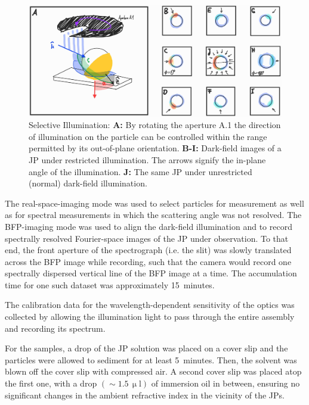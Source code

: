 \documentclass[10pt]{article}
\begin{document}
\begin{multicols}{2}
\begin{figure}[t!]
    \centering
    \includegraphics[width=\textwidth]{[fig] selective illumination}
    \caption{Selective Illumination:   
    {\sffamily\bfseries A:} By rotating the aperture A.1 the direction of illumination on the particle can be controlled within the range permitted by its out-of-plane orientation. 
    {\sffamily\bfseries B-I:} Dark-field images of a JP under restricted illumination. 
    The arrows signify the in-plane angle of the illumination.  
    {\sffamily\bfseries J:} The same JP under unrestricted (normal) dark-field illumination. 
    }
    \label{fig:selective-illumination}
\end{figure}

The real-space-imaging mode was used to select particles for measurement as well as for spectral measurements in which the scattering angle was not resolved. 
The BFP-imaging mode was used to align the dark-field illumination and to record spectrally resolved Fourier-space images of the JP under observation. 
To that end, the front aperture of the spectrograph (i.e. the slit) was slowly translated across the BFP image while recording, such that the camera would record one spectrally dispersed vertical line of the BFP image at a time. 
The accumulation time for one such dataset was approximately \mbox{15 minutes}.  

The calibration data for the wavelength-dependent sensitivity of the optics was collected by allowing the illumination light to pass through the entire assembly and recording its spectrum. 

For the samples, a drop of the JP solution was placed on a cover slip and the particles were allowed to sediment for at least \mbox{5 minutes}. 
Then, the solvent was blown off the cover slip with compressed air. 
A second cover slip was placed atop the first one, with a drop \mbox{$(\sim 1.5\,\mathrm{\upmu l})$} of immersion oil in between, ensuring no significant changes in the ambient refractive index in the vicinity of the JPs. 


\end{multicols}
\end{document}

